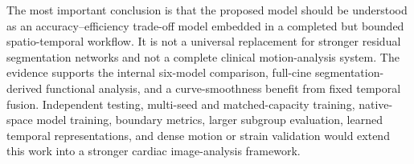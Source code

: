 The most important conclusion is that the proposed model should be understood as an accuracy--efficiency trade-off model embedded in a completed but bounded spatio-temporal workflow. It is not a universal replacement for stronger residual segmentation networks and not a complete clinical motion-analysis system. The evidence supports the internal six-model comparison, full-cine segmentation-derived functional analysis, and a curve-smoothness benefit from fixed temporal fusion. Independent testing, multi-seed and matched-capacity training, native-space model training, boundary metrics, larger subgroup evaluation, learned temporal representations, and dense motion or strain validation would extend this work into a stronger cardiac image-analysis framework.
